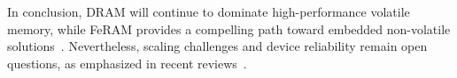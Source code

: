 In conclusion, DRAM will continue to dominate high-performance volatile memory, while FeRAM provides a compelling path toward embedded non-volatile solutions~\cite{noheda2023}. 
Nevertheless, scaling challenges and device reliability remain open questions, as emphasized in recent reviews~\cite{martin2020}.

